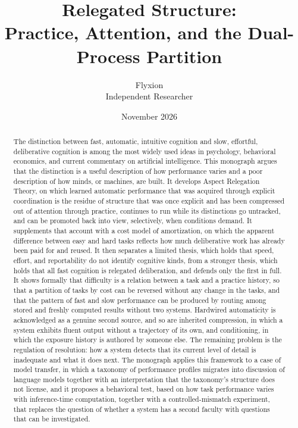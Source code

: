 \documentclass[11pt]{report}
\title{Relegated Structure:\\Practice, Attention, and the Dual-Process Partition}
\author{Flyxion\\Independent Researcher}
\date{November 2026}
\theoremstyle{remark}
\theoremstyle{definition}
\begin{document}
\maketitle

\begin{abstract}
\noindent The distinction between fast, automatic, intuitive cognition and slow, effortful, deliberative cognition is among the most widely used ideas in psychology, behavioral economics, and current commentary on artificial intelligence. This monograph argues that the distinction is a useful description of how performance varies and a poor description of how minds, or machines, are built. It develops Aspect Relegation Theory, on which learned automatic performance that was acquired through explicit coordination is the residue of structure that was once explicit and has been compressed out of attention through practice, continues to run while its distinctions go untracked, and can be promoted back into view, selectively, when conditions demand. It supplements that account with a cost model of amortization, on which the apparent difference between easy and hard tasks reflects how much deliberative work has already been paid for and reused. It then separates a limited thesis, which holds that speed, effort, and reportability do not identify cognitive kinds, from a stronger thesis, which holds that all fast cognition is relegated deliberation, and defends only the first in full. It shows formally that difficulty is a relation between a task and a practice history, so that a partition of tasks by cost can be reversed without any change in the tasks, and that the pattern of fast and slow performance can be produced by routing among stored and freshly computed results without two systems. Hardwired automaticity is acknowledged as a genuine second source, and so are inherited compression, in which a system exhibits fluent output without a trajectory of its own, and conditioning, in which the exposure history is authored by someone else. The remaining problem is the regulation of resolution: how a system detects that its current level of detail is inadequate and what it does next. The monograph applies this framework to a case of model transfer, in which a taxonomy of performance profiles migrates into discussion of language models together with an interpretation that the taxonomy's structure does not license, and it proposes a behavioral test, based on how task performance varies with inference-time computation, together with a controlled-mismatch experiment, that replaces the question of whether a system has a second faculty with questions that can be investigated.
\end{abstract}
\end{document}
